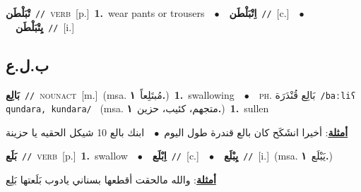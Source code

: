 \documentclass[10pt,a4paper,twoside]{article} %
\begin{document}
\begin{multicols}{2}
{\setlength\topsep{0pt}\textbf{\foreignlanguage{arabic}{تْبَلْطَن}}\ {\color{gray}\texttt{//}\color{black}}\ \textsc{verb}\ [p.]\ \textbf{1.}~wear pants or trousers\ \ $\bullet$\ \ \setlength\topsep{0pt}\textbf{\foreignlanguage{arabic}{اِتْبَلْطَن}}\ {\color{gray}\texttt{//}\color{black}}\ [c.]\ \ $\bullet$\ \ \setlength\topsep{0pt}\textbf{\foreignlanguage{arabic}{يِتْبَلْطَن}}\ {\color{gray}\texttt{//}\color{black}}\ [i.]\ } \vspace{2mm}

\vspace{-3mm}
\subsection*{\color{blue}\foreignlanguage{arabic}{ب.ل.ع}\color{blue}{}} 

{\setlength\topsep{0pt}\textbf{\foreignlanguage{arabic}{بَالِع}}\ {\color{gray}\texttt{//}\color{black}}\ \textsc{noun\textunderscore act}\ [m.]\ \color{gray}(msa. \foreignlanguage{arabic}{مُبتَلِعاً}~\foreignlanguage{arabic}{\textbf{١.}})\color{black}\ \textbf{1.}~swallowing\ \ $\bullet$\ \ \textsc{ph.} \color{gray} \foreignlanguage{arabic}{بَالِع قُنْدَرَة}\color{black}\ {\color{gray}\texttt{/{\sffamily baːliʕ qundara, kundara}/}\color{black}}\ \color{gray} (msa. \foreignlanguage{arabic}{متجهم، كئيب، حزين}~\foreignlanguage{arabic}{\textbf{١.}})\color{black}\ \textbf{1.}~sullen\  \begin{flushright}\color{gray}\foreignlanguage{arabic}{\textbf{\underline{\foreignlanguage{arabic}{أمثلة}}}: أخيرا انشَكَح كان بالع قندرة طول اليوم\ $\bullet$\ \  ابنك بالع 10 شيكل الحقيه يا حزينة}\end{flushright}\color{black}} \vspace{2mm}

{\setlength\topsep{0pt}\textbf{\foreignlanguage{arabic}{بَلَع}}\ {\color{gray}\texttt{//}\color{black}}\ \textsc{verb}\ [p.]\ \textbf{1.}~swallow\ \ $\bullet$\ \ \setlength\topsep{0pt}\textbf{\foreignlanguage{arabic}{اِبْلَع}}\ {\color{gray}\texttt{//}\color{black}}\ [c.]\ \ $\bullet$\ \ \setlength\topsep{0pt}\textbf{\foreignlanguage{arabic}{يِبْلَع}}\ {\color{gray}\texttt{//}\color{black}}\ [i.]\ \color{gray}(msa. \foreignlanguage{arabic}{يَبْلَع}~\foreignlanguage{arabic}{\textbf{١.}})\color{black}\  \begin{flushright}\color{gray}\foreignlanguage{arabic}{\textbf{\underline{\foreignlanguage{arabic}{أمثلة}}}: والله مالحقت أقطعها بسناني يادوب بَلَعتها بَلِع}\end{flushright}\color{black}} \vspace{2mm}


\end{multicols}
\end{document}
